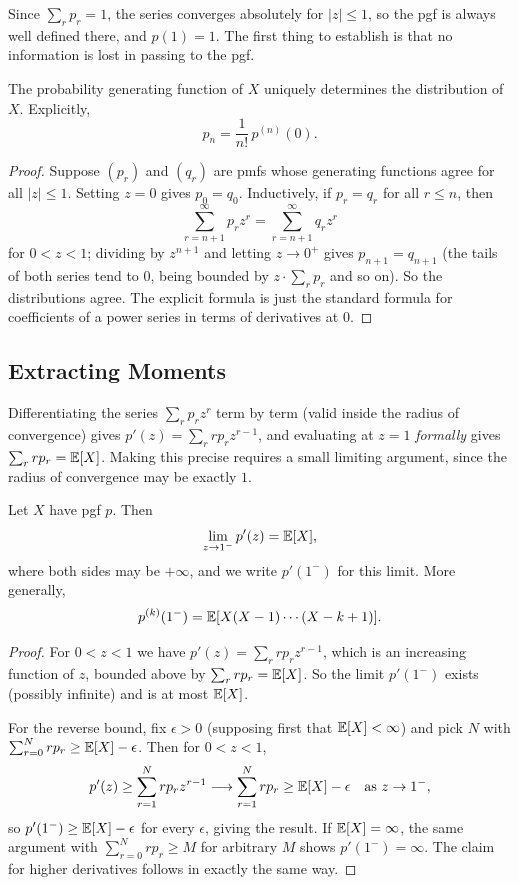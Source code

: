 \documentclass[a4paper]{scrartcl}
\begin{document}
Since $\sum_r p_r = 1$, the series converges absolutely for $|z| \leq 1$, so the pgf is always well defined there, and $p(1) = 1$. The first thing to establish is that no information is lost in passing to the pgf.

\begin{theorem}
	The probability generating function of $X$ uniquely determines the distribution of $X$. Explicitly,
	$$
	p_n = \frac{1}{n!}\, p^{(n)}(0).
	$$
\end{theorem}
\begin{proof}
	Suppose $(p_r)$ and $(q_r)$ are pmfs whose generating functions agree for all $|z| \leq 1$. Setting $z = 0$ gives $p_0 = q_0$. Inductively, if $p_r = q_r$ for all $r \leq n$, then
	$$
	\sum_{r = n + 1}^{\infty} p_r z^r = \sum_{r = n+1}^{\infty} q_r z^r
	$$
	for $0 < z < 1$; dividing by $z^{n + 1}$ and letting $z \rightarrow 0^+$ gives $p_{n + 1} = q_{n+1}$ (the tails of both series tend to $0$, being bounded by $z \cdot \sum_r p_r$ and so on). So the distributions agree. The explicit formula is just the standard formula for coefficients of a power series in terms of derivatives at $0$.
\end{proof}

\subsection{Extracting Moments}

Differentiating the series $\sum_r p_r z^r$ term by term (valid inside the radius of convergence) gives $p'(z) = \sum_r r p_r z^{r - 1}$, and evaluating at $z = 1$ \emph{formally} gives $\sum_r r p_r = \mathbb{E}[X]$. Making this precise requires a small limiting argument, since the radius of convergence may be exactly $1$.

\begin{theorem}
	Let $X$ have pgf $p$. Then
	$$
	\lim_{z \to 1^-} p'(z) = \mathbb{E}[X],
	$$
	where both sides may be $+\infty$, and we write $p'(1^-)$ for this limit. More generally,
	$$
	p^{(k)}(1^-) = \mathbb{E}[X(X - 1)\cdots(X - k + 1)].
	$$
\end{theorem}
\begin{proof}
	For $0 < z < 1$ we have $p'(z) = \sum_{r} r p_r z^{r - 1}$, which is an increasing function of $z$, bounded above by $\sum_r r p_r = \mathbb{E}[X]$. So the limit $p'(1^-)$ exists (possibly infinite) and is at most $\mathbb{E}[X]$.

	For the reverse bound, fix $\epsilon > 0$ (supposing first that $\mathbb{E}[X] < \infty$) and pick $N$ with $\sum_{r = 0}^{N} r p_r \geq \mathbb{E}[X] - \epsilon$. Then for $0 < z < 1$,
	$$
	p'(z) \geq \sum_{r = 1}^{N} r p_r z^{r - 1} \longrightarrow \sum_{r = 1}^{N} r p_r \geq \mathbb{E}[X] - \epsilon \quad \text{as } z \rightarrow 1^-,
	$$
	so $p'(1^-) \geq \mathbb{E}[X] - \epsilon$ for every $\epsilon$, giving the result. If $\mathbb{E}[X] = \infty$, the same argument with $\sum_{r=0}^N rp_r \geq M$ for arbitrary $M$ shows $p'(1^-) = \infty$. The claim for higher derivatives follows in exactly the same way.
\end{proof}
\end{document}
